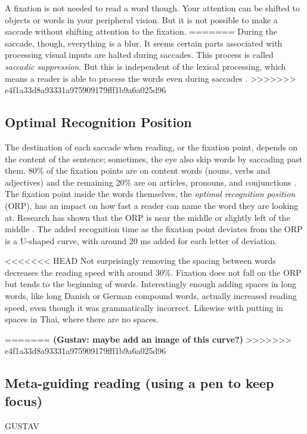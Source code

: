 A fixation is not needed to read a word though. Your attention can be shifted to objects or words in your peripheral vision. But it is not possible to make a saccade without shifting attention to the fixation.
=======
During the saccade, though, everything is a blur. It seems certain parts associated with processing visual inputs are halted during saccades. This process is called \textit{saccadic suppression}. But this is independent of the lexical processing, which means a reader is able to process the words even during saccades \cite{KILDE MATHIAS}.
>>>>>>> e4f1a33d8a93331a975909179fff1b9a6a025d96

\subsection{Optimal Recognition Position} \label{ORP}
The destination of each saccade when reading, or the fixation point, depends on the content of the sentence; sometimes, the eye also skip words by saccading past them. 80\% of the fixation points are on content words (nouns, verbs and adjectives) and the remaining 20\% are on articles, pronouns, and conjunctions \cite{eysenck_cognitive_2010}. The fixation point inside the words themselves, the \textit{optimal recognition position} (ORP), has an impact on how fast a reader can name the word they are looking at. Research has shown that the ORP is near the middle or slightly left of the middle \cite{oregan_optimal_1992, nazir_letter_1998, oregan_convenient_1984}. The added recognition time as the fixation point deviates from the ORP is a U-shaped curve, with around 20 ms added for each letter of deviation.

<<<<<<< HEAD
Not surprisingly removing the spacing between words decreases the reading speed with around 30\%. Fixation does not fall on the ORP but tends to the beginning of words. Interestingly enough adding spaces in long words, like long Danish or German compound words, actually increased reading speed, even though it was grammatically incorrect. Likewise with putting in spaces in Thai, where there are no spaces.

=======
\textbf{(Gustav: maybe add an image of this curve?)}
>>>>>>> e4f1a33d8a93331a975909179fff1b9a6a025d96

\subsection{Meta-guiding reading (using a pen to keep focus)}
GUSTAV

